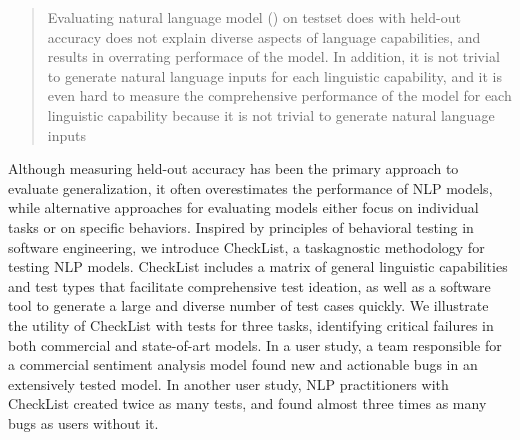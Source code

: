 \begin{abstract}
  Evaluating natural language model (\Nlp) on testset does with
  held-out accuracy does not explain diverse aspects of language
  capabilities, and results in overrating performace of the \Nlp
  model. In addition, it is not trivial to generate natural language
  inputs for each linguistic capability, and 
  it is even hard to measure the comprehensive
  performance of the \Nlp model for each linguistic capability because
  it is not trivial to generate natural language inputs 
  
  
  
\end{abstract}


Although measuring held-out accuracy has been the primary approach to
evaluate generalization, it often overestimates the performance of NLP
models, while alternative approaches for evaluating models either
focus on individual tasks or on specific behaviors. Inspired by
principles of behavioral testing in software engineering, we introduce
CheckList, a taskagnostic methodology for testing NLP
models. CheckList includes a matrix of general linguistic capabilities
and test types that facilitate comprehensive test ideation, as well as
a software tool to generate a large and diverse number of test cases
quickly. We illustrate the utility of CheckList with tests for three
tasks, identifying critical failures in both commercial and
state-of-art models. In a user study, a team responsible for a
commercial sentiment analysis model found new and actionable bugs in
an extensively tested model. In another user study, NLP practitioners
with CheckList created twice as many tests, and found almost three
times as many bugs as users without it.
